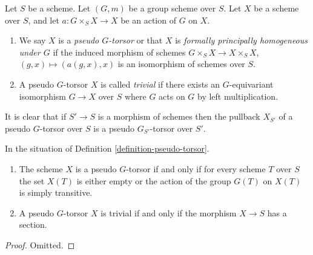 \begin{definition}
\label{definition-pseudo-torsor}
Let $S$ be a scheme.
Let $(G, m)$ be a group scheme over $S$.
Let $X$ be a scheme over $S$, and let
$a : G \times_S X \to X$ be an action of $G$ on $X$.
\begin{enumerate}
\item We say $X$ is a {\it pseudo $G$-torsor} or that $X$ is
{\it formally principally homogeneous under $G$} if the induced
morphism of schemes $G \times_S X \to X \times_S X$,
$(g, x) \mapsto (a(g, x), x)$ is an isomorphism of schemes over $S$.
\item A pseudo $G$-torsor $X$ is called {\it trivial} if there exists
an $G$-equivariant isomorphism $G \to X$ over $S$ where $G$ acts on
$G$ by left multiplication.
\end{enumerate}
\end{definition}

\noindent
It is clear that if $S' \to S$ is a morphism of schemes then
the pullback $X_{S'}$ of a pseudo $G$-torsor over $S$ is a
pseudo $G_{S'}$-torsor over $S'$.

\begin{lemma}
\label{lemma-characterize-trivial-pseudo-torsors}
In the situation of
Definition \ref{definition-pseudo-torsor}.
\begin{enumerate}
\item The scheme $X$ is a pseudo $G$-torsor if and only if for every scheme
$T$ over $S$ the set $X(T)$ is either empty or the action of the group $G(T)$
on $X(T)$ is simply transitive.
\item A pseudo $G$-torsor $X$ is trivial if and only if the morphism
$X \to S$ has a section.
\end{enumerate}
\end{lemma}

\begin{proof}
Omitted.
\end{proof}

